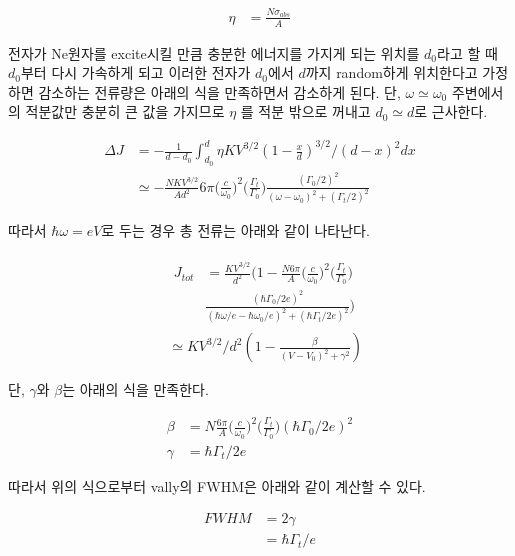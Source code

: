 \documentclass[%
 reprint,
 amsmath,amssymb,
 aps,
]{revtex4-2}
\begin{document}
\begin{align}
	\eta &= \frac{N\sigma_{abs}}{A}
\end{align}

전자가 Ne원자를 excite시킬 만큼 충분한 에너지를 가지게 되는 위치를 $d_{0}$라고 할 때 $d_{0}$부터 다시 가속하게 되고 이러한 전자가 $d_{0}$에서 $d$까지 random하게 위치한다고 가정하면 감소하는 전류량은 아래의 식을 만족하면서 감소하게 된다. 단, $\omega \simeq \omega_{0}$ 주변에서의 적분값만 충분히 큰 값을 가지므로 $\eta$ 를 적분 밖으로 꺼내고 $d_{0}\simeq d$로 근사한다.

\begin{align}
	\Delta J &= -\frac{1}{d-d_{0}}\int_{d_{0}}^{d} \eta KV^{3/2}(1-\frac{x}{d})^{3/2}/(d-x)^{2}dx\\
	&\simeq -\frac{NKV^{3/2}}{Ad^{2}} 6\pi \Bigg(\frac{c}{\omega_{0}}\Bigg)^{2}\Bigg(\frac{\Gamma_{t}}{\Gamma_{0}}\Bigg)\frac{(\Gamma_{0}/2)^{2}}{(\omega-\omega_{0})^{2}+(\Gamma_{t}/2)^{2}}
\end{align}


따라서 $\hbar \omega = eV$로 두는 경우 총 전류는 아래와 같이 나타난다.

\begin{align}
	&\begin{aligned}
	J_{tot} &= \frac{KV^{3/2}}{d^{2}}\Bigg(1 -\frac{N 6\pi}{A} \Bigg(\frac{c}{\omega_{0}}\Bigg)^{2}\Bigg(\frac{\Gamma_{t}}{\Gamma_{0}}\Bigg)\\
	&\frac{(\hbar\Gamma_{0}/2e)^{2}}{(\hbar\omega/e-\hbar\omega_{0}/e)^{2}+(\hbar\Gamma_{t}/2e)^{2}}\Bigg)
	\end{aligned}\\
	&\simeq KV^{3/2}/d^{2}\left(1-\frac{\beta}{(V-V_{0})^{2}+\gamma^{2}} \right)
\end{align}

단, $\gamma$와 $\beta$는 아래의 식을 만족한다.

\begin{align}
	\beta &= N\frac{ 6\pi}{A} \Bigg(\frac{c}{\omega_{0}}\Bigg)^{2}\Bigg(\frac{\Gamma_{t}}{\Gamma_{0}}\Bigg) (\hbar\Gamma_{0}/2e)^{2} \\
	\gamma &= \hbar\Gamma_{t}/2e 
\end{align}

따라서 위의 식으로부터 vally의 FWHM은 아래와 같이 계산할 수 있다.

\begin{align}
	FWHM &= 2\gamma\\
	&= \hbar\Gamma_{t}/e 
\end{align}
\end{document}
